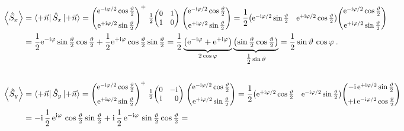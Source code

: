 \documentclass[10pt,a4paper]{article}
\def\ph{\phantom}
\newcommand{\const}[1]{\text{#1}}
\newcommand{\expect}[1]{\left< #1 \right>}
\newcommand{\mat}[1]{
    \begin{pmatrix}
        #1
    \end{pmatrix}
}
\newcommand{\smat}[2][1]{
    \scalebox{#1}{$\mat{#2}$}
}
\newcommand{\bra}[1]{\left< #1 \right|}
\newcommand{\ket}[1]{\left| #1 \right>}
\newcommand{\e}[1]{\const{e}^{#1}}
\renewcommand{\i}{\const{i}}
\def\1{\mathbbm{1}}
\begin{document}
\begin{align*}
    \expect{ \hat S_x }
    &= \bra{+\vec n} \hat S_x \ket{+\vec n}
    = \smat[0.9]{
        \e{-\i \varphi/2} \cos \tfrac{\vartheta}{2}\\[7pt]
        \e{+\i \varphi/2} \sin \tfrac{\vartheta}{2}
    }^+
    \; \tfrac{1}{2} \smat[0.9]{0&1\\1&0} \;
    \smat[0.9]{
        \e{-\i \varphi/2} \cos \tfrac{\vartheta}{2}\\[7pt]
        \e{+\i \varphi/2} \sin \tfrac{\vartheta}{2}
    }
    = \frac{1}{2}
    \smat[0.9]{
        \e{-\i \varphi/2} \sin \tfrac{\vartheta}{2} &
        \e{+\i \varphi/2} \cos \tfrac{\vartheta}{2}
    }
    \smat[0.9]{
        \e{-\i \varphi/2} \cos \tfrac{\vartheta}{2}\\[7pt]
        \e{+\i \varphi/2} \sin \tfrac{\vartheta}{2}
    }
    \\
    &= \frac{1}{2} \e{-\i \varphi} \sin \tfrac{\vartheta}{2} \cos \tfrac{\vartheta}{2}
    + \frac{1}{2} \e{+\i \varphi} \cos \tfrac{\vartheta}{2} \sin \tfrac{\vartheta}{2}
    =
    \frac{1}{2}
    \underbrace{
        \left( \e{-\i \varphi} + \e{+\i \varphi} \right)
    }_{2 \cos \varphi}
    \underbrace{
        \left( \sin \tfrac{\vartheta}{2} \cos \tfrac{\vartheta}{2} \right)
    }_{\tfrac{1}{2} \sin \vartheta}
    =
    \frac{1}{2}
    \sin \vartheta \,
    \cos \varphi
    \: .
    \\
    \\
    \expect{\hat S_y}
    &= \bra{+\vec n} \hat S_y \ket{+\vec n}
    = \smat[0.9]{
        \e{-\i \varphi/2} \cos \tfrac{\vartheta}{2}\\[7pt]
        \e{+\i \varphi/2} \sin \tfrac{\vartheta}{2}
    }^+
    \; \tfrac{1}{2} \smat[0.9]{0&\!-\i\\\i&\ph{\!-}0} \;
    \smat[0.9]{
        \e{-\i \varphi/2} \cos \tfrac{\vartheta}{2}\\[7pt]
        \e{+\i \varphi/2} \sin \tfrac{\vartheta}{2}
    }
    = \frac{1}{2}
    \smat[0.9]{
        \e{+\i \varphi/2} \cos \tfrac{\vartheta}{2} &
        \e{-\i \varphi/2} \sin \tfrac{\vartheta}{2}
    }
    \smat[0.9]{
        -\i \, \e{+\i \varphi/2} \sin \tfrac{\vartheta}{2}\\[7pt]
        +\i \, \e{-\i \varphi/2} \cos \tfrac{\vartheta}{2}
    }
    \\
    &=
    -\i \, \frac{1}{2} \, \e{\i\varphi} \, \cos \tfrac{\vartheta}{2} \sin \tfrac{\vartheta}{2}
    +\i \, \frac{1}{2} \, \e{-\i\varphi} \, \sin \tfrac{\vartheta}{2} \cos \tfrac{\vartheta}{2}
    =

\end{align*}
\end{document}
